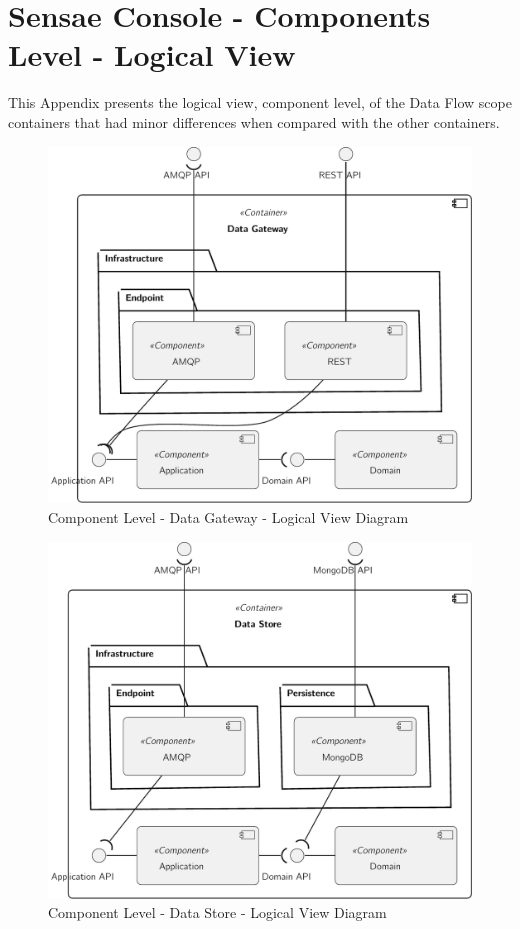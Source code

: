 \chapter{Sensae Console - Components Level - Logical View}
\label{AppendixC}

This Appendix presents the logical view, component level, of the Data Flow scope containers that had minor differences when compared with the other containers.

\begin{figure}[H]
   \centering
   \includegraphics[page=1,width=0.6\columnwidth]{assets/diagrams/design/architectural/level3/logical/data-gateway.pdf}
   \caption[Component Level - Data Gateway - Logical View Diagram]{Component Level - Data Gateway - Logical View Diagram}
   \label{fig:AppendixC:gateway}
\end{figure}

\begin{figure}[H]
   \centering
   \includegraphics[page=1,width=0.6\columnwidth]{assets/diagrams/design/architectural/level3/logical/data-store.pdf}
   \caption[Component Level - Data Store - Logical View Diagram]{Component Level - Data Store - Logical View Diagram}
   \label{fig:AppendixC:store}
\end{figure}

